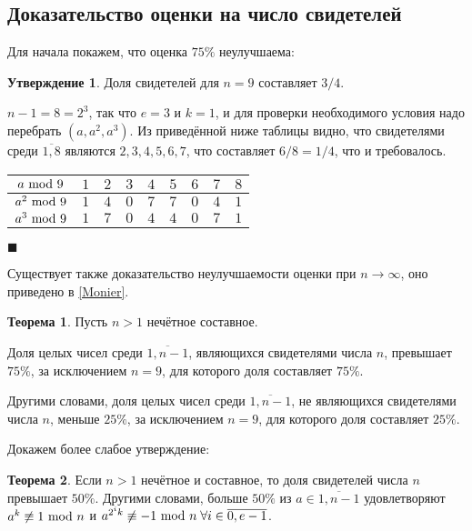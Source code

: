 \documentclass[12pt]{article}
\theoremstyle{definition}
\newtheorem{Th}{Теорема}
\newtheorem{St}{Утверждение}
\numberwithin{Def}{section}
\numberwithin{Th}{section}
\numberwithin{St}{section}
\newenvironment{Proof}                    
        {\par\noindent{\bf Доказательство.}}
        {\hfill$\scriptstyle\blacksquare$}
\begin{document}
\subsection{Доказательство оценки на число свидетелей}

Для начала покажем, что оценка $75\%$ неулучшаема:
 
\begin{St}
	Доля свидетелей для $n=9$ составляет $3/4$.	
\end{St}

\begin{Proof}
	$n-1=8=2^3$, так что $e=3$ и $k=1$, и для проверки необходимого условия
	надо перебрать $(a,a^2,a^3)$. Из приведённой ниже таблицы видно, что
	свидетелями среди $\overline{1,8}$ являются $2, 3, 4, 5, 6, 7$, что
	составляет $6/8=1/4$, что и требовалось.
	
	\begin{center}
	\begin{tabular}{ c|c|c|c|c|c|c|c|c}
    $a\ \mathrm{mod}\ 9$   & $1$ & $2$ & $3$ & $4$ & $5$ & $6$ & $7$ & $8$ \\ \hline
    $a^2\ \mathrm{mod}\ 9$ & $1$ & $4$ & $0$ & $7$ & $7$ & $0$ & $4$ & $1$ \\
    $a^3\ \mathrm{mod}\ 9$ & $1$ & $7$ & $0$ & $4$ & $4$ & $0$ & $7$ & $1$
  \end{tabular}
\end{center}
\end{Proof}

Существует также доказательство неулучшаемости оценки при $n\to\infty$,
оно приведено в \ref{Monier}.

\begin{Th}
 	Пусть $n>1$ нечётное составное.
 
 	Доля целых чисел среди $\overline{1,n-1}$, являющихся свидетелями числа $n$,
 	превышает $75\%$, за исключением $n=9$, для которого доля составляет $75\%$.
 	
 	Другими словами, доля целых чисел среди $\overline{1,n-1}$, не являющихся
 	свидетелями числа $n$, меньше $25\%$, за исключением $n=9$, для которого доля 
 	составляет $25\%$.
\end{Th}

Докажем более слабое утверждение:

\begin{Th}
	Если $n>1$ нечётное и составное, то доля свидетелей числа $n$ превышает
	$50\%$. Другими словами, больше $50\%$ из $a\in\overline{1,n-1}$
	удовлетворяют $a^k\not\equiv 1\ \mathrm{mod}\ n$ и
	$a^{2^ik}\not\equiv-1\ \mathrm{mod}\ n\;\forall i\in\overline{0,e-1}$.
\end{Th}
\end{document}
